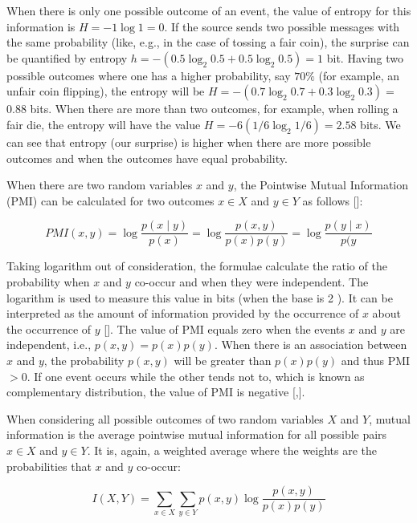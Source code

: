 When there is only one possible outcome of an event, the value of entropy for this information is $H=-1 \log 1=0$. If the source sends two possible messages with the same probability (like, e.g., in the case of tossing a fair coin), the surprise can be quantified by entropy $h=-\left(0.5 \log _{2} 0.5+0.5 \log _{2} 0.5\right)=1$ bit. Having two possible outcomes where one has a higher probability, say $70 \%$ (for example, an unfair coin flipping), the entropy will be $H=-\left(0.7 \log _{2} 0.7+0.3 \log _{2} 0.3\right)=$ 0.88 bits. When there are more than two outcomes, for example, when rolling a fair die, the entropy will have the value $H=-6\left(1 / 6 \log _{2} 1 / 6\right)=2.58$ bits. We can see that entropy (our surprise) is higher when there are more possible outcomes and when the outcomes have equal probability.

When there are two random variables $x$ and $y$, the Pointwise Mutual Information (PMI) can be calculated for two outcomes $x \in X$ and $y \in Y$ as follows [\cite{ref85}]:


\begin{equation*}
P M I(x, y)=\log \frac{p(x \mid y)}{p(x)}=\log \frac{p(x, y)}{p(x) p(y)}=\log \frac{p(y \mid x)}{p(y} \tag{14.7}
\end{equation*}


Taking logarithm out of consideration, the formulae calculate the ratio of the probability when $x$ and $y$ co-occur and when they were independent. The logarithm is used to measure this value in bits (when the base is 2 ). It can be\\
interpreted as the amount of information provided by the occurrence of $x$ about the occurrence of $y$ [\cite{ref85}]. The value of PMI equals zero when the events $x$ and $y$ are independent, i.e., $p(x, y)=p(x) p(y)$. When there is an association between $x$ and $y$, the probability $p(x, y)$ will be greater than $p(x) p(y)$ and thus PMI $>0$. If one event occurs while the other tends not to, which is known as complementary distribution, the value of PMI is negative [\cite{ref25},\cite{ref52}].

When considering all possible outcomes of two random variables $X$ and $Y$, mutual information is the average pointwise mutual information for all possible pairs $x \in X$ and $y \in Y$. It is, again, a weighted average where the weights are the probabilities that $x$ and $y$ co-occur:


\begin{equation*}
I(X, Y)=\sum_{x \in X} \sum_{y \in Y} p(x, y) \log \frac{p(x, y)}{p(x) p(y)} \tag{14.8}
\end{equation*}


